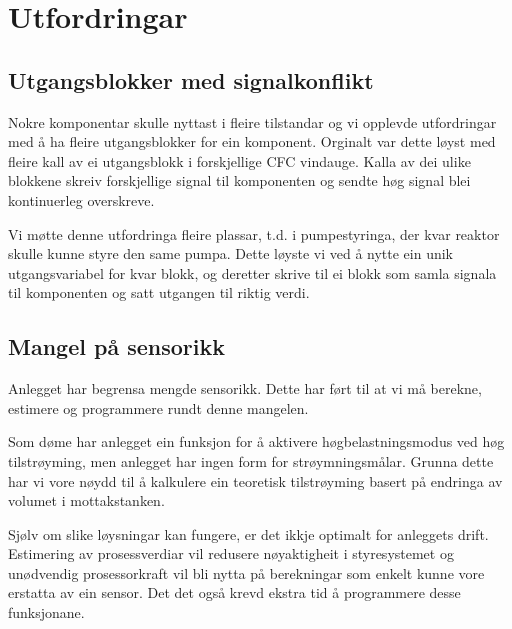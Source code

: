 \section{Utfordringar}
\thispagestyle{fancy}

\subsection{Utgangsblokker med signalkonflikt}
Nokre komponentar skulle nyttast i fleire tilstandar og vi opplevde 
utfordringar med å ha fleire utgangsblokker for ein komponent.
Orginalt var dette løyst med fleire kall av ei utgangsblokk i forskjellige \gls{CFC} vindauge.
Kalla av dei ulike blokkene skreiv forskjellige signal til komponenten og
sendte høg signal blei kontinuerleg overskreve.

Vi møtte denne utfordringa fleire plassar, t.d. i pumpestyringa,
der kvar reaktor skulle kunne styre den same pumpa.
Dette løyste vi ved å nytte ein unik utgangsvariabel for kvar blokk, 
og deretter skrive til ei blokk som samla signala til komponenten og satt utgangen til riktig verdi.

\subsection{Mangel på sensorikk}

Anlegget har begrensa mengde sensorikk. 
Dette har ført til at vi må berekne, estimere og programmere rundt denne mangelen.

Som døme har anlegget ein funksjon for å aktivere
høgbelastningsmodus ved høg tilstrøyming, 
men anlegget har ingen form for strøymningsmålar.\newline
Grunna dette har vi vore nøydd til å kalkulere ein teoretisk tilstrøyming basert på endringa av volumet i mottakstanken.

Sjølv om slike løysningar kan fungere, er det ikkje optimalt for anleggets drift.
Estimering av prosessverdiar vil redusere nøyaktigheit i styresystemet og
unødvendig prosessorkraft vil bli nytta på berekningar som enkelt kunne vore erstatta av ein sensor.\newline
Det det også krevd ekstra tid å programmere desse funksjonane.


